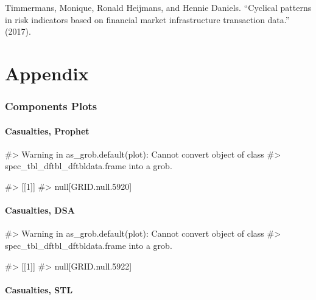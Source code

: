 Timmermans, Monique, Ronald Heijmans, and Hennie Daniels. ``Cyclical
patterns in risk indicators based on financial market infrastructure
transaction data.'' (2017).

\hypertarget{appendix}{%
\section{Appendix}\label{appendix}}

\hypertarget{components-plots}{%
\subsubsection{Components Plots}\label{components-plots}}

\hypertarget{casualties-prophet}{%
\paragraph{Casualties, Prophet}\label{casualties-prophet}}

\begin{Schunk}
\begin{Soutput}
#> Warning in as_grob.default(plot): Cannot convert object of class
#> spec_tbl_dftbl_dftbldata.frame into a grob.
\end{Soutput}
\begin{Soutput}
#> [[1]]
#> null[GRID.null.5920]
\end{Soutput}
\end{Schunk}

\hypertarget{casualties-dsa}{%
\paragraph{Casualties, DSA}\label{casualties-dsa}}

\begin{Schunk}
\begin{Soutput}
#> Warning in as_grob.default(plot): Cannot convert object of class
#> spec_tbl_dftbl_dftbldata.frame into a grob.
\end{Soutput}
\begin{Soutput}
#> [[1]]
#> null[GRID.null.5922]
\end{Soutput}
\end{Schunk}

\hypertarget{casualties-stl}{%
\paragraph{Casualties, STL}\label{casualties-stl}}

